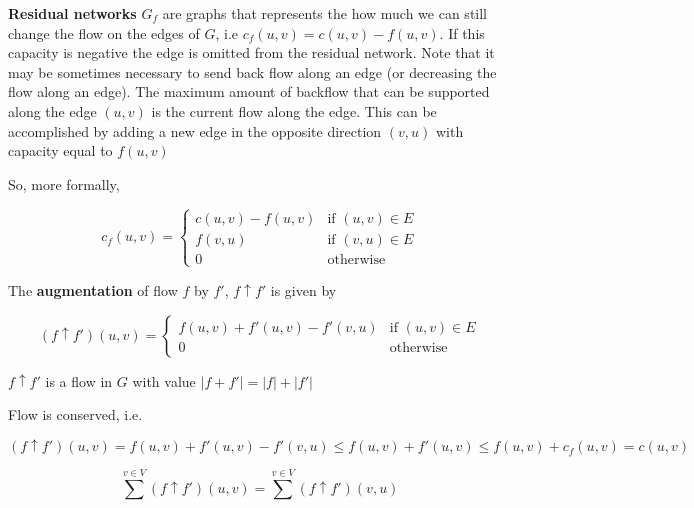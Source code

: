 \documentclass[../notes.tex]{subfiles}
\begin{document}
\begin{definition}
	\textbf{Residual networks} $ G_f $ are graphs that represents the how much we can still change the flow on the edges of $ G $, i.e $ c_f(u,v) = c(u,v) - f(u,v) $. If this capacity is negative the edge is omitted from the residual network.
	Note that it may be sometimes necessary to send back flow along an edge (or decreasing the flow along an edge).
	The maximum amount of backflow that can be supported along the edge $ (u,v) $ is the current flow along the edge.
	This can be accomplished by adding a new edge in the opposite direction $ (v,u) $ with capacity equal to $ f(u,v) $

	So, more formally,

	\begin{equation}
		c_f(u,v) = \begin{cases}
			c(u,v) - f(u,v) & \text{if } (u,v) \in E \\
			f(v,u) & \text{if } (v, u) \in E \\
			0 & \text{otherwise}
		\end{cases}
	\end{equation}

\end{definition}

The \textbf{augmentation} of flow $ f $ by $ f' $, $ f \uparrow f' $ is given by

\begin{equation}
	(f \uparrow f')(u,v) = \begin{cases}
		f(u,v) + f'(u,v) - f'(v,u) & \text{if } (u,v) \in E \\
		0 & \text{otherwise}
	\end{cases}
\end{equation}

\begin{lemma}
	$ f \uparrow f'$ is a flow in $ G $ with value $ |f+f'|= |f| + |f'| $
\end{lemma}

\begin{lemma}
	Flow is conserved, i.e.


	\begin{equation}
		(f\uparrow f') (u, v) = f(u,v) + f'(u,v) - f'(v,u) \le f(u,v) + f'(u,v) \le f(u,v) + c_f(u,v) = c(u,v)
	\end{equation}

	\begin{equation}
		\sum_{}^{v\in V} (f \uparrow f') (u, v) = 
		\sum_{}^{v\in V} (f \uparrow f') (v, u)
	\end{equation}
	
	
\end{lemma}
\end{document}
